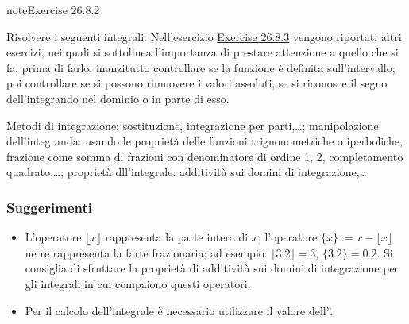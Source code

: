 \documentclass[letterpaper,10pt,italian]{jupyterBook}
\begin{document}
\begin{sphinxadmonition}{note}{Exercise 26.8.2}



\sphinxAtStartPar
Risolvere i seguenti integrali. Nell’esercizio \hyperref[exercise:ex:integrals:definite:attention]{Exercise 26.8.3} vengono riportati altri esercizi, nei quali si sottolinea l’importanza di prestare attenzione a quello che si fa, prima di farlo: inanzitutto controllare se la funzione è definita sull’intervallo; poi controllare se si possono rimuovere i valori assoluti, se si riconosce il segno dell’integrando nel dominio o in parte di esso.

\sphinxAtStartPar
{} Metodi di integrazione: sostituzione, integrazione per parti,…; manipolazione dell’integranda: usando le proprietà delle funzioni trignonometriche o iperboliche, frazione come somma di frazioni con denominatore di ordine 1, 2, completamento quadrato,…; proprietà dll’integrale: additività sui domini di integrazione,…
\subsubsection*{Suggerimenti}
\begin{itemize}
\item {} 
\sphinxAtStartPar
L’operatore \(\lfloor x \rfloor\) rappresenta la parte intera di \(x\); l’operatore \(\{ x \} := x - \lfloor x \rfloor\) ne re rappresenta la farte frazionaria; ad esempio: \(\lfloor 3.2 \rfloor = 3\), \(\{ 3.2 \} = 0.2\). Si consiglia di sfruttare la proprietà di additività sui domini di integrazione per gli integrali in cui compaiono questi operatori.

\item {} 
\sphinxAtStartPar
Per il calcolo dell’integrale  è necessario utilizzare il valore dell”{\hyperref[\detokenize{ch/multivariable-calculus/integrals:integral-etox2}]{}}.


\end{itemize}
\end{sphinxadmonition}
\end{document}
